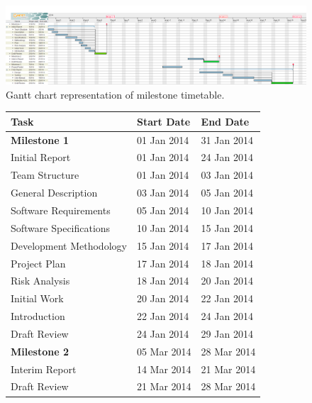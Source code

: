 \documentclass[11pt,a4paper]{article}
\renewcommand{\arraystretch}{1.5}
\begin{document}
\begin{figure}[h!]
\centering
\includegraphics[angle=90,width=0.37\linewidth]{./img/GanttChart}
\caption{Gantt chart representation of milestone timetable.}
\label{fig:GanttChart}
\end{figure}


\renewcommand{\arraystretch}{1.5}
\newcommand*{\tableIndent}{\hspace*{0.4cm}}

\begin{figure}[H]
\centering
\begin{tabular}{|l|l|l|}
\hline \textbf{Task} & \textbf{Start Date} & \textbf{End Date} \\ 
\hline \hline \textbf{Milestone 1} & 01 Jan 2014 & 31 Jan 2014 \\
\hline\tableIndent Initial Report  & 01 Jan 2014 & 24 Jan 2014 \\  
\hline\tableIndent\tableIndent Team Structure  & 01 Jan 2014 & 03 Jan 2014 \\ 
\hline\tableIndent\tableIndent General Description & 03 Jan 2014 & 05 Jan 2014 \\ 
\hline\tableIndent\tableIndent Software Requirements & 05 Jan 2014 & 10 Jan 2014 \\ 
\hline\tableIndent\tableIndent Software Specifications & 10 Jan 2014 & 15 Jan 2014 \\ 
\hline\tableIndent\tableIndent Development Methodology & 15 Jan 2014 & 17 Jan 2014 \\ 
\hline\tableIndent\tableIndent Project Plan  & 17 Jan 2014 & 18 Jan 2014 \\ 
\hline\tableIndent\tableIndent Risk Analysis & 18 Jan 2014 & 20 Jan 2014 \\ 
\hline\tableIndent\tableIndent Initial Work  & 20 Jan 2014 & 22 Jan 2014 \\
\hline\tableIndent\tableIndent Introduction  & 22 Jan 2014 & 24 Jan 2014 \\  
\hline\tableIndent Draft Review  & 24 Jan 2014 & 29 Jan 2014 \\ 
\hline\textbf{Milestone 2} & 05 Mar 2014 & 28 Mar 2014 \\ 
\hline\tableIndent Interim Report & 14 Mar 2014 & 21 Mar 2014 \\ 
\hline\tableIndent Draft Review & 21 Mar 2014 & 28 Mar 2014 \\

\end{tabular}
\end{figure}
\end{document}
